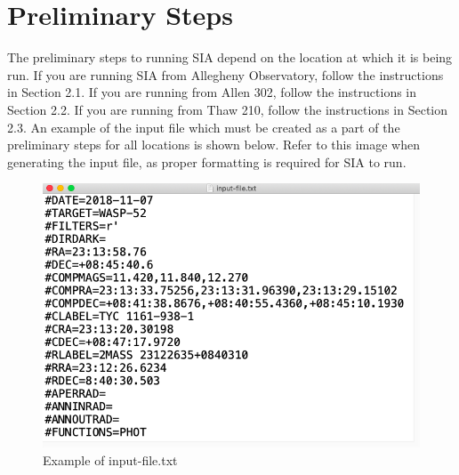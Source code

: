 \documentclass[11pt]{report}
\begin{document}
\chapter{Preliminary Steps}
The preliminary steps to running SIA depend on the location at which it is being run. If you are running SIA from Allegheny Observatory, follow the instructions in Section 2.1. If you are running from Allen 302, follow the instructions in Section 2.2. If you are running from Thaw 210, follow the instructions in Section 2.3. An example of the input file which must be created as a part of the preliminary steps for all locations is shown below. Refer to this image when generating the input file, as proper formatting is required for SIA to run.  \\
\begin{figure}[!h]
\begin{center}
\includegraphics[totalheight=.3\textheight]{example.png}
\caption{Example of input-file.txt}
\label{fig:inputfile}
\end{center}
\end{figure}
\end{document}
